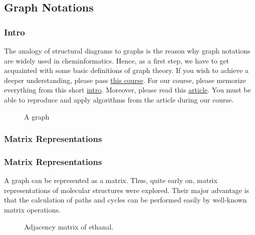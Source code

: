 \documentclass{beamer}
\begin{document}
\subsection{Graph Notations}
\begin{frame}
\frametitle{Intro}
The analogy of structural diagrams to graphs is the reason why graph notations are widely used in cheminformatics. Hence, as a first step, we have to get acquainted with some basic definitions of graph theory. If you wish to achieve a deeper understanding, please pass \href{https://www.coursera.org/learn/teoriya-grafov}{this course}. For our course, please memorize everything from this short \href{https://stanford.edu/~rezab/classes/cme305/W14/Notes/2.pdf}{intro}.
Moreover, please read this \href{https://towardsdatascience.com/graph-data-structure-cheat-sheet-for-coding-interviews-a38aadf8aa87}{article}. You must be able to reproduce and apply algorithms from the article during our course. 
\begin{figure}[h!]
\caption{A graph}
\end{figure}
\end{frame}

\subsubsection{Matrix Representations}
\begin{frame}
\frametitle{Matrix Representations}
A graph can be represented as a matrix. Thus, quite early on, matrix representations of molecular structures were explored. Their major advantage is that the calculation of paths and cycles can be performed easily by well-known matrix operations. 
\begin{figure}[h!]
\caption{Adjacency matrix of ethanal\cite{gasteiger2006chemoinformatics}.}
\end{figure}
\end{frame}
\end{document}

